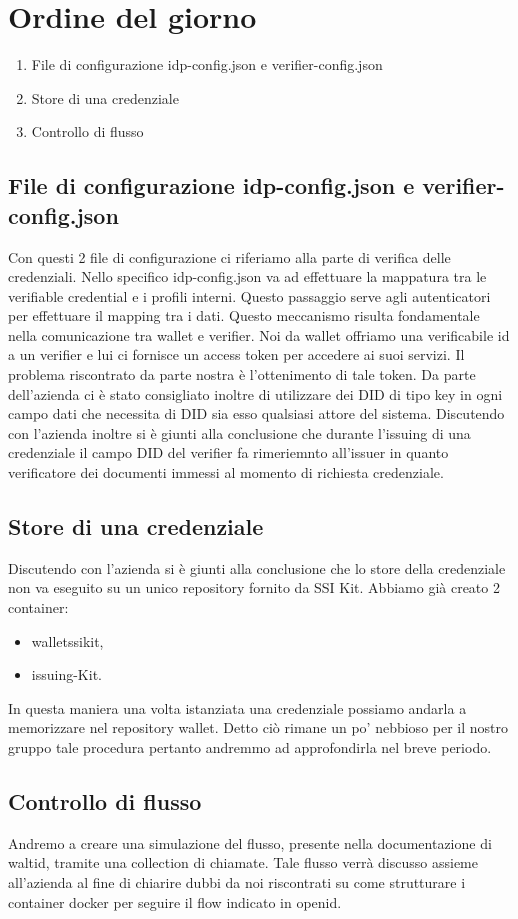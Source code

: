 \section{Ordine del giorno}
\begin{enumerate}
\item File di configurazione idp-config.json e verifier-config.json 
\item Store di una credenziale
\item Controllo di flusso
\end{enumerate}

\subsection{File di configurazione idp-config.json e verifier-config.json} 
Con questi 2 file di configurazione ci riferiamo alla parte di verifica delle credenziali. Nello specifico idp-config.json va ad effettuare la mappatura tra le verifiable credential e i profili interni. Questo passaggio serve agli autenticatori per effettuare il mapping tra i dati. 
Questo meccanismo risulta fondamentale nella comunicazione tra wallet e verifier. Noi da wallet offriamo una verificabile id a un verifier e lui ci fornisce un access token per accedere ai suoi servizi. Il problema riscontrato da parte nostra è l'ottenimento di tale token. 
Da parte dell'azienda ci è stato consigliato inoltre di utilizzare dei DID di tipo key in ogni campo dati che necessita di DID sia esso qualsiasi attore del sistema. 
Discutendo con l'azienda inoltre si è giunti alla conclusione che durante l'issuing di una credenziale il campo DID del verifier fa rimeriemnto all'issuer in quanto verificatore dei documenti immessi al momento di richiesta credenziale.

\subsection{Store di una credenziale}
Discutendo con l'azienda si è giunti alla conclusione che lo store della credenziale non va eseguito su un unico repository fornito da SSI Kit. 
Abbiamo già creato 2 container:
\begin{itemize}
  \item walletssikit,
  \item issuing-Kit.
\end{itemize}

In questa maniera una volta istanziata una credenziale possiamo andarla a memorizzare nel repository wallet. 
Detto ciò rimane un po' nebbioso per il nostro gruppo tale procedura pertanto andremmo ad approfondirla nel breve periodo.
\subsection{Controllo di flusso}
Andremo a creare una simulazione del flusso, presente nella documentazione di waltid, tramite una collection di chiamate. 
Tale flusso verrà discusso assieme all'azienda al fine di chiarire dubbi da noi riscontrati su come strutturare i container docker per seguire il flow indicato in openid.


